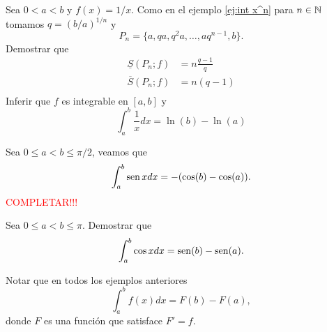 \begin{ejercicio}{} Sea $0< a<b$  y $f(x)=1/x$. Como en el ejemplo \ref{ej:int x^n}  para $n\in\mathbb{N}$ tomamos $q=(b/a)^{1/n}$ y 
\[P_n=\{a,qa,q^2a,\ldots, aq^{n-1},b\}.\]  
Demostrar que
\[
\begin{split}
  \underline{S}(P_n;f)&= n\frac{q-1}{q}\\
  \overline{S}(P_n;f)&= n(q-1)\\
\end{split}
\]
Inferir que $f$ es integrable en $[a,b]$ y
\[
 \int_a^b \frac{1}{x} dx= \ln(b)-\ln(a)
\]
\end{ejercicio}


\begin{ejemplo}{} Sea $0\leq a<b\leq \pi/2$, veamos que
\[
 \int_a^b \operatorname{sen} x dx=-(\cos(b)-\cos(a)).
\]
\textcolor{red}{COMPLETAR!!!}
\end{ejemplo}



\begin{ejercicio}{} Sea $0\leq a<b\leq \pi$. Demostrar que
\[
 \int_a^b \cos x dx=\operatorname{sen}(b)-\operatorname{sen}(a).
\]
\end{ejercicio}


\begin{observa} Notar que en todos los ejemplos anteriores
\[
 \int_a^bf(x)dx=F(b)-F(a),
\]
donde $F$ es una función que satisface $F'=f$.
\end{observa}

% 
% 
% 
% 
% 
% 
%  




